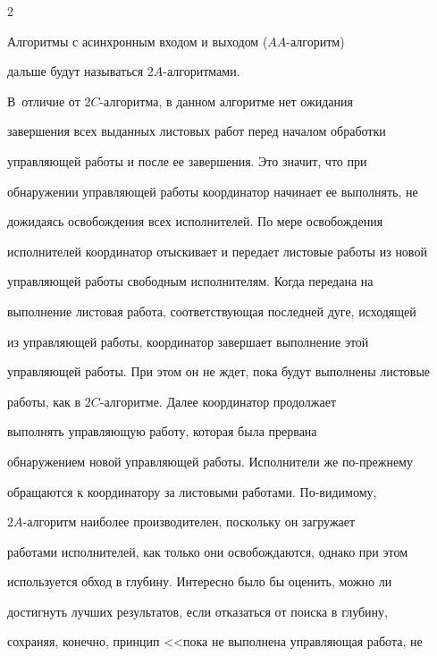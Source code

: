 \begin{multicols}{2}
{}


 


 


 \vspace*{-1pt}


      


Алгоритмы с асинхронным входом и выходом ($AA$-ал\-го\-ритм) 


дальше будут называться $2A$-ал\-го\-рит\-ма\-ми. 


В~отличие от $2C$-ал\-го\-рит\-ма, в данном алгоритме нет ожидания 


завершения всех выданных листовых работ перед началом обработки 


управляющей работы и после ее завершения. Это значит, что при 


обнаружении управляющей работы координатор начинает ее выполнять, не 


дожидаясь освобождения всех исполнителей. По мере освобождения 


исполнителей координатор отыскивает и передает листовые работы из новой 


управляющей работы свободным исполнителям. Когда передана на 


выполнение листовая работа, соответ\-ст\-ву\-ющая последней дуге, исходящей 


из управ\-ля\-ющей работы, координатор завершает выполнение этой 


управ\-ля\-ющей работы. При этом он не ждет, пока будут выполнены листовые 


работы, как в $2C$-ал\-го\-рит\-ме. Далее координатор продолжает 


выполнять управ\-ля\-ющую работу, которая была прервана


обнаружением новой управляющей работы. Исполнители же по-прежнему 


обращаются к координатору за листовыми работами. По-ви\-ди\-мо\-му, 


      $2A$-ал\-го\-ритм наиболее производителен, поскольку он загружает 


работами исполнителей, как только они освобождаются, однако при этом 


используется обход в глубину. Интересно было бы оценить, можно ли 


достигнуть лучших результатов, если отказаться от поиска в глубину, 


сохраняя, конечно, принцип <<пока не выполнена управляющая работа, не 



\end{multicols}
